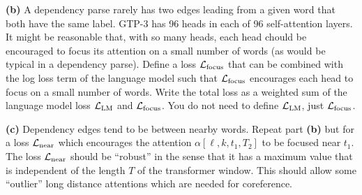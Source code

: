 \documentclass{article}
\begin{document}
\medskip
{\bf (b)} A dependency parse rarely has two edges leading from a given word that both have the same label.  GTP-3 has 96 heads in each of 96 self-attention layers.
It might be reasonable that, with so many heads, each head chould be encouraged to focus its attention on a small number of words (as would be typical in a dependency parse).
Define a loss ${\cal L}_{\mathrm{focus}}$ that can be combined with the log loss term of the language model such that
${\cal L}_{\mathrm{focus}}$ encourages each head to focus on a small number of words.  Write the total loss as a weighted sum of the language model loss ${\cal L}_{\mathrm{LM}}$
and ${\cal L}_{\mathrm{focus}}$.  You do not need to define ${\cal L}_{\mathrm{LM}}$, just ${\cal L}_\mathrm{focus}$.


\medskip
    {\bf (c)} Dependency edges tend to be between nearby words.
    Repeat part {\bf (b)} but for a loss ${\cal L}_{\mathrm{near}}$ which encourages the attention $\alpha[\ell,k,t_1,T_2]$ to be focused near $t_1$.
The loss ${\cal L}_{\mathrm{near}}$ should be ``robust'' in the sense that it has a maximum value that is independent of the length $T$ of the transformer
window.  This should allow some ``outlier'' long distance attentions which are needed for coreference.

\end{document}
